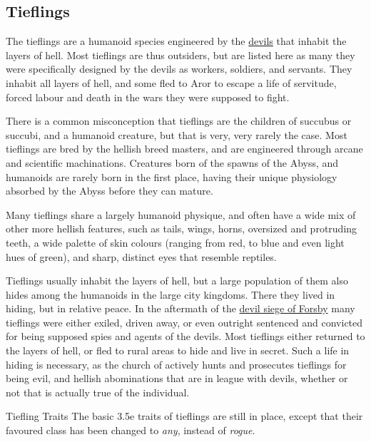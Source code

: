 \subsection{Tieflings}
\label{sec:Tieflings}

The tieflings are a humanoid species engineered by the
\hyperref[sec:Devils]{devils} that inhabit the layers of hell. Most tieflings
are thus outsiders, but are listed here as many they were specifically
designed by the devils as workers, soldiers, and servants. They inhabit all
layers of hell, and some fled to Aror to escape a life of servitude, forced
labour and death in the wars they were supposed to fight.

There is a common misconception that tieflings are the children of succubus or
succubi, and a humanoid creature, but that is very, very rarely the case. Most
tieflings are bred by the hellish breed masters, and are engineered through
arcane and scientific machinations. Creatures born of the spawns of the Abyss,
and humanoids are rarely born in the first place, having their unique
physiology absorbed by the Abyss before they can mature.

Many tieflings share a largely humanoid physique, and often have a wide mix of
other more hellish features, such as tails, wings, horns, oversized and
protruding teeth, a wide palette of skin colours (ranging from red, to blue
and even light hues of green), and sharp, distinct eyes that resemble
reptiles.

Tieflings usually inhabit the layers of hell, but a large population of them
also hides among the humanoids in the large city kingdoms. There they lived
in hiding, but in relative peace. In the aftermath of the \hyperref[sec:Devil
  Siege]{devil siege of Forsby} many tieflings were either exiled, driven
away, or even outright sentenced and convicted for being supposed spies and
agents of the devils. Most tieflings either returned to the layers of hell, or
fled to rural areas to hide and live in secret. Such a life in hiding is
necessary, as the church of  actively hunts and prosecutes
tieflings for being evil, and hellish abominations that are in league with
devils, whether or not that is actually true of the individual.

\begin{35e}{Tiefling Traits}
  The basic 3.5e traits of tieflings are still in place, except that their
  favoured class has been changed to \emph{any}, instead of \emph{rogue}.
\end{35e}
